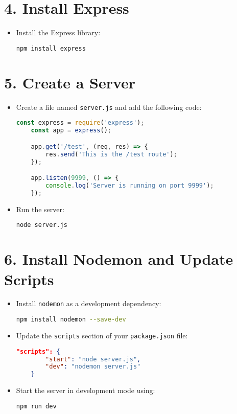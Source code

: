 \documentclass[a4paper,12pt]{article}
\begin{document}
\section*{4. Install Express}
\begin{itemize}
    \item Install the Express library:
    \begin{lstlisting}[language=bash]
    npm install express
    \end{lstlisting}
\end{itemize}

\section*{5. Create a Server}
\begin{itemize}
    \item Create a file named \texttt{server.js} and add the following code:
    \begin{lstlisting}[language=javascript]
    const express = require('express');
    const app = express();

    app.get('/test', (req, res) => {
        res.send('This is the /test route');
    });

    app.listen(9999, () => {
        console.log('Server is running on port 9999');
    });
    \end{lstlisting}
    \item Run the server:
    \begin{lstlisting}[language=bash]
    node server.js
    \end{lstlisting}
\end{itemize}

\section*{6. Install Nodemon and Update Scripts}
\begin{itemize}
    \item Install \texttt{nodemon} as a development dependency:
    \begin{lstlisting}[language=bash]
    npm install nodemon --save-dev
    \end{lstlisting}
    \item Update the \texttt{scripts} section of your \texttt{package.json} file:
    \begin{lstlisting}[language=json]
    "scripts": {
        "start": "node server.js",
        "dev": "nodemon server.js"
    }
    \end{lstlisting}
    \item Start the server in development mode using:
    \begin{lstlisting}[language=bash]
    npm run dev
    \end{lstlisting}
\end{itemize}
\end{document}
